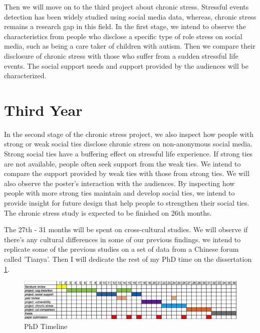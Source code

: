 Then we will move on to the third project about chronic stress. Stressful events detection has been widely studied using social media data, whereas, chronic stress remains a research gap in this field. In the first stage, we intend to observe the characteristics from people who disclose a specific type of role stress on social media, such as being a care taker of children with autism. Then we compare their disclosure of chronic stress with those who suffer from a sudden stressful life events. The social support needs and support provided by the audiences will be characterized.

\section{Third Year}
In the second stage of the chronic stress project, we also inspect how people with strong or weak social ties disclose chronic stress on non-anonymous social media. Strong social ties have a buffering effect on stressful life experience. If strong ties are not available, people often seek support from the weak ties. We intend to compare the support provided by weak ties with those from strong ties. We will also observe the poster's interaction with the audiences. By inspecting how people with more strong ties maintain and develop social ties, we intend to provide insight for future design that help people to strengthen their social ties. The chronic stress study is expected to be finished on 26th months. 

The 27th - 31 months will be spent on cross-cultural studies. We will observe if there's any cultural differences in some of our previous findings. we intend to replicate some of the previous studies on a set of data from a Chinese forum called 'Tianya'. Then I will dedicate the rest of my PhD time on the dissertation \ref{fig:one}. 

\begin{figure}
  \includegraphics[width=160mm,scale=1.5]{Chapter5/timeline.png}
  \caption{PhD Timeline}
  \label{fig:one}
\end{figure}
